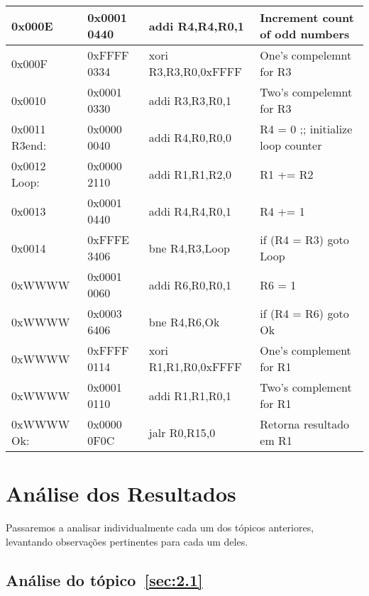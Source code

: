 \documentclass[12pt]{article}
\begin{document}
\begin{table}[H]
\begin{tabular}{|l|l|l|l|}
        0x000E        & 0x0001 0440 & addi R4,R4,R0,1      & Increment count of odd numbers                        \\\hline
        0x000F        & 0xFFFF 0334 & xori R3,R3,R0,0xFFFF & One's compelemnt for R3                               \\\hline
        0x0010        & 0x0001 0330 & addi R3,R3,R0,1      & Two's compelemnt for R3                               \\\hline
        0x0011 R3end: & 0x0000 0040 & addi R4,R0,R0,0      & R4 = 0 ;; initialize loop counter                     \\\hline
        0x0012 Loop:  & 0x0000 2110 & addi R1,R1,R2,0      & R1 += R2                                              \\\hline
        0x0013        & 0x0001 0440 & addi R4,R4,R0,1      & R4 += 1                                               \\\hline
        0x0014        & 0xFFFE 3406 & bne  R4,R3,Loop      & if (R4 \!= R3) goto Loop                              \\\hline
        0xWWWW        & 0x0001 0060 & addi R6,R0,R0,1      & R6 = 1                                                \\\hline
        0xWWWW        & 0x0003 6406 & bne  R4,R6,Ok        & if (R4 \!= R6) goto Ok                                \\\hline
        0xWWWW        & 0xFFFF 0114 & xori R1,R1,R0,0xFFFF & One's complement for R1                               \\\hline
        0xWWWW        & 0x0001 0110 & addi R1,R1,R0,1      & Two's complement for R1                               \\\hline
        0xWWWW Ok:    & 0x0000 0F0C & jalr R0,R15,0        & Retorna resultado em R1                               \\\hline
    \end{tabular}\label{tab:programs:mult}
\end{table}


\section{Análise dos Resultados}\label{sec:resultados}

Passaremos a analisar individualmente cada um dos tópicos anteriores, levantando
observações pertinentes para cada um deles.

\subsection{Análise do tópico~\ref{sec:2.1}}\label{sec:analise2.1}
\end{document}
